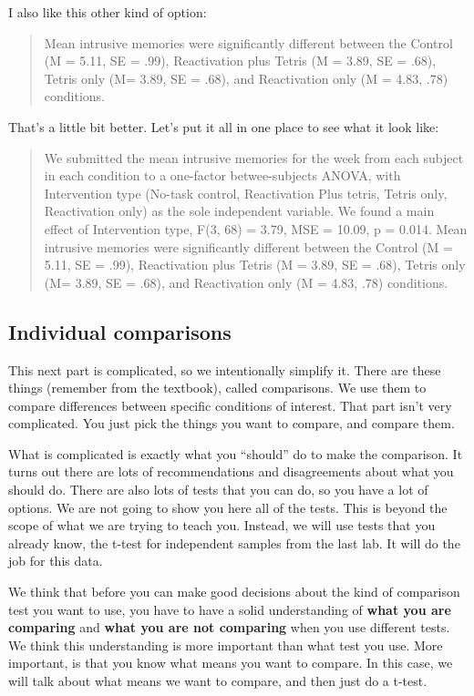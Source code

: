 \documentclass[
]{book}
\begin{document}
I also like this other kind of option:

\begin{quote}
Mean intrusive memories were significantly different between the Control (M = 5.11, SE = .99), Reactivation plus Tetris (M = 3.89, SE = .68), Tetris only (M= 3.89, SE = .68), and Reactivation only (M = 4.83, .78) conditions.
\end{quote}

That's a little bit better. Let's put it all in one place to see what it look like:

\begin{quote}
We submitted the mean intrusive memories for the week from each subject in each condition to a one-factor betwee-subjects ANOVA, with Intervention type (No-task control, Reactivation Plus tetris, Tetris only, Reactivation only) as the sole independent variable. We found a main effect of Intervention type, F(3, 68) = 3.79, MSE = 10.09, p = 0.014. Mean intrusive memories were significantly different between the Control (M = 5.11, SE = .99), Reactivation plus Tetris (M = 3.89, SE = .68), Tetris only (M= 3.89, SE = .68), and Reactivation only (M = 4.83, .78) conditions.
\end{quote}

\hypertarget{individual-comparisons}{%
\subsection{Individual comparisons}\label{individual-comparisons}}

This next part is complicated, so we intentionally simplify it. There are these things (remember from the textbook), called comparisons. We use them to compare differences between specific conditions of interest. That part isn't very complicated. You just pick the things you want to compare, and compare them.

What is complicated is exactly what you ``should'' do to make the comparison. It turns out there are lots of recommendations and disagreements about what you should do. There are also lots of tests that you can do, so you have a lot of options. We are not going to show you here all of the tests. This is beyond the scope of what we are trying to teach you. Instead, we will use tests that you already know, the t-test for independent samples from the last lab. It will do the job for this data.

We think that before you can make good decisions about the kind of comparison test you want to use, you have to have a solid understanding of \textbf{what you are comparing} and \textbf{what you are not comparing} when you use different tests. We think this understanding is more important than what test you use. More important, is that you know what means you want to compare. In this case, we will talk about what means we want to compare, and then just do a t-test.
\end{document}
